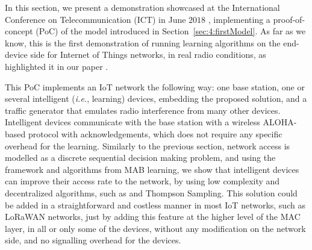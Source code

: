 

\graphicspath{{2-Chapters/4-Chapter/IEEE_WCNC_2019__DemoICT.git/pictures/}}

In this section, we present a demonstration showcased at the International Conference on Telecommunication (ICT) in June $2018$ \cite{Besson2018ICT,Besson2019WCNC}, implementing a proof-of-concept (PoC) of the model introduced in Section~\ref{sec:4:firstModel}.
%
As far as we know, this is the first demonstration of running learning algorithms on the end-device side for Internet of Things networks, in real radio conditions, as highlighted it in our paper \cite{MoyBesson2019}.

This PoC implements an IoT network the following way: one base station, one or several intelligent (\emph{i.e.}, learning) devices, embedding the proposed solution,
and a traffic generator that emulates radio interference from many other devices.
Intelligent devices communicate with the base station with a wireless ALOHA-based protocol with acknowledgements, which does not require any specific overhead for the learning.
%
Similarly to the previous section, network access is modelled as a discrete sequential decision making problem, and using the framework and algorithms from MAB learning, we show that intelligent devices can improve their access rate to the network, by using low complexity and decentralized algorithms, such as \UCB{} and Thompson Sampling.
%
This solution could be added in a straightforward and costless manner in most IoT networks, such as LoRaWAN networks, just by adding this feature at the higher level of the MAC layer, in all or only some of the devices, without any modification on the network side, and no signalling overhead for the devices.

